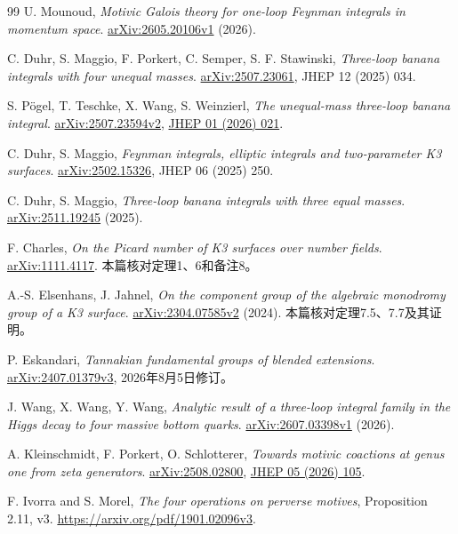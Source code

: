 \documentclass[11pt,a4paper]{ctexart}
\theoremstyle{cnplain}\newtheorem{theorem}{定理}[section]
\theoremstyle{definition}\newtheorem{definition}[theorem]{定义}
\theoremstyle{remark}\newtheorem{remark}[theorem]{注}
\begin{document}
\begin{thebibliography}{99}
 U. Mounoud,
\emph{Motivic Galois theory for one-loop Feynman integrals in momentum space}.
\href{https://arxiv.org/abs/2605.20106v1}{arXiv:2605.20106v1} (2026).

 C. Duhr, S. Maggio, F. Porkert, C. Semper, S. F. Stawinski,
\emph{Three-loop banana integrals with four unequal masses}.
\href{https://arxiv.org/abs/2507.23061}{arXiv:2507.23061}, JHEP 12 (2025) 034.

 S. Pögel, T. Teschke, X. Wang, S. Weinzierl,
\emph{The unequal-mass three-loop banana integral}.
\href{https://arxiv.org/abs/2507.23594v2}{arXiv:2507.23594v2},
\href{https://doi.org/10.1007/JHEP01(2026)021}{JHEP 01 (2026) 021}.

 C. Duhr, S. Maggio,
\emph{Feynman integrals, elliptic integrals and two-parameter K3 surfaces}.
\href{https://arxiv.org/abs/2502.15326}{arXiv:2502.15326}, JHEP 06 (2025) 250.

 C. Duhr, S. Maggio,
\emph{Three-loop banana integrals with three equal masses}.
\href{https://arxiv.org/abs/2511.19245}{arXiv:2511.19245} (2025).

 F. Charles,
\emph{On the Picard number of K3 surfaces over number fields}.
\href{https://arxiv.org/abs/1111.4117}{arXiv:1111.4117}.
本篇核对定理1、6和备注8。

 A.-S. Elsenhans, J. Jahnel,
\emph{On the component group of the algebraic monodromy group of a K3 surface}.
\href{https://arxiv.org/abs/2304.07585v2}{arXiv:2304.07585v2} (2024).
本篇核对定理7.5、7.7及其证明。

 P. Eskandari,
\emph{Tannakian fundamental groups of blended extensions}.
\href{https://arxiv.org/abs/2407.01379v3}{arXiv:2407.01379v3}, 2026年8月5日修订。

 J. Wang, X. Wang, Y. Wang,
\emph{Analytic result of a three-loop integral family in the Higgs decay to four massive bottom quarks}.
\href{https://arxiv.org/abs/2607.03398v1}{arXiv:2607.03398v1} (2026).

 A. Kleinschmidt, F. Porkert, O. Schlotterer,
\emph{Towards motivic coactions at genus one from zeta generators}.
\href{https://arxiv.org/abs/2508.02800}{arXiv:2508.02800},
\href{https://doi.org/10.1007/JHEP05(2026)105}{JHEP 05 (2026) 105}.

 F. Ivorra and S. Morel,
\emph{The four operations on perverse motives}, Proposition 2.11, v3.
\url{https://arxiv.org/pdf/1901.02096v3}.


\end{thebibliography}
\end{document}
